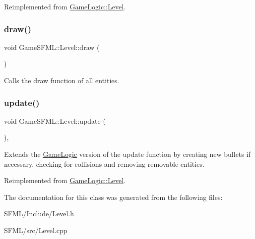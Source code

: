 Reimplemented from \hyperlink{classGameLogic_1_1Level_ad9ac3fbb69cbfe7552a5ce8737a4cfd5}{Game\+Logic\+::\+Level}.

\mbox{\label{classGameSFML_1_1Level_a102b4f351a97cde5a71a473b15126847}} 
\subsubsection{\texorpdfstring{draw()}{draw()}}
{\footnotesize\ttfamily void Game\+S\+F\+M\+L\+::\+Level\+::draw (\begin{DoxyParamCaption}{ }\end{DoxyParamCaption})}

Calls the draw function of all entities. \mbox{\label{classGameSFML_1_1Level_ab98f7a9ceb040bef609c2c96990707ba}} 
\subsubsection{\texorpdfstring{update()}{update()}}
{\footnotesize\ttfamily void Game\+S\+F\+M\+L\+::\+Level\+::update (\begin{DoxyParamCaption}{ }\end{DoxyParamCaption})\hspace{0.3cm}{\ttfamily [override]}, {\ttfamily [virtual]}}

Extends the \hyperlink{namespaceGameLogic}{Game\+Logic} version of the update function by creating new bullets if necessary, checking for collisions and removing removable entities. 

Reimplemented from \hyperlink{classGameLogic_1_1Level_a72f5b36a0254821aabaaafa48834998b}{Game\+Logic\+::\+Level}.



The documentation for this class was generated from the following files\+:\begin{DoxyCompactItemize}
\item 
S\+F\+M\+L/\+Include/Level.\+h\item 
S\+F\+M\+L/src/Level.\+cpp\end{DoxyCompactItemize}
